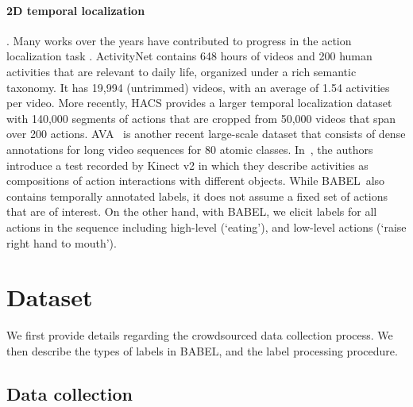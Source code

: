 \documentclass[final]{cvpr}
\def\babel{BABEL}
\begin{document}
\paragraph{2D temporal localization}. 
Many works over the years have contributed to progress in the action localization task \cite{DBLP:journals/cviu/IdreesZJGLSS17,DBLP:conf/eccv/SigurdssonVWFLG16,yeung2018every}. 
ActivityNet \cite{DBLP:conf/mir/SedmidubskyEZ19} contains 648 hours of videos and 200 human activities that are relevant to daily life, organized under a rich semantic taxonomy. 
It has 19,994 (untrimmed) videos, with an average of 1.54 activities per video. 
More recently, HACS \cite{DBLP:conf/iccv/Zhao0TY19} provides a larger temporal localization dataset with 140,000 segments of actions that are cropped from 50,000 videos that span over 200 actions. 
AVA~\cite{DBLP:conf/cvpr/GuSRVPLVTRSSM18} is another recent large-scale dataset that consists of dense annotations for long video sequences for 80 atomic classes. In~\cite{Wu2015WatchnpatchUU}, the authors introduce a test recorded by Kinect v2 in which they describe activities as compositions of action interactions with different objects.
While \babel~also contains temporally annotated labels, it does not assume a fixed set of actions that are of interest. On the other hand, with \babel, we 
 elicit labels for all actions in the sequence including high-level (`eating'), and low-level actions (`raise right hand to mouth').  \section{Dataset}

We first provide details regarding the crowdsourced data collection process. We then describe the types of labels in \babel, and the label processing procedure. 

\subsection{Data collection}
\label{subsec:data_collection}
\end{document}

